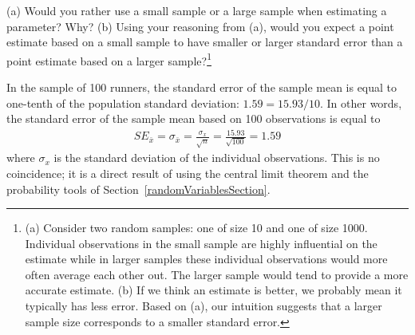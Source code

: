 \begin{exercise}\label{exerciseUsingseOfXBar}
(a) Would you rather use a small sample or a large sample when estimating a parameter? Why? (b) Using your reasoning from (a), would you expect a point estimate based on a small sample to have smaller or larger standard error than a point estimate based on a larger sample?\footnote{(a) Consider two random samples: one of size 10 and one of size 1000. Individual observations in the small sample are highly influential on the estimate while in larger samples these individual observations would more often average each other out. The larger sample would tend to provide a more accurate estimate. (b) If we think an estimate is better, we probably mean it typically has less error. Based on (a), our intuition suggests that a larger sample size corresponds to a smaller standard error.}
\end{exercise}

In the sample of 100 runners, the standard error of the sample mean is equal to one-tenth of the population standard deviation: $1.59 = 15.93/10$. In other words, the standard error of the sample mean based on 100 observations is equal to
\begin{eqnarray*}
SE_{\bar{x}} = \sigma_{\bar{x}} = \frac{\sigma_{x}}{\sqrt{n}} = \frac{15.93}{\sqrt{100}} = 1.59
\end{eqnarray*}
where $\sigma_{x}$ is the standard deviation of the individual observations. 
This is no coincidence; 
it is a direct result of using the central limit theorem and the probability tools of Section~\ref{randomVariablesSection}.

%


